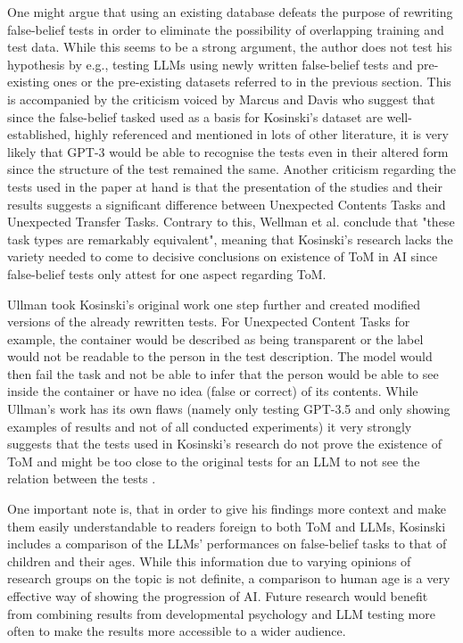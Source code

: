 One might argue that using an existing database defeats the purpose of rewriting false-belief tests in order to eliminate the possibility of overlapping training and test data. While this seems to be a strong argument, the author does not test his hypothesis by e.g., testing LLMs using newly written false-belief tests and pre-existing ones or the pre-existing datasets referred to in the previous section. This is accompanied by the criticism voiced by Marcus and Davis \cite{critics2} who suggest that since the false-belief tasked used as a basis for Kosinski's dataset are well-established, highly referenced and mentioned in lots of other literature, it is very likely that GPT-3 would be able to recognise the tests even in their altered form since the structure of the test remained the same. Another criticism regarding the tests used in the paper at hand is that the presentation of the studies and their results suggests a significant difference between Unexpected Contents Tasks and Unexpected Transfer Tasks. Contrary to this, Wellman et al. conclude that "these task types are remarkably equivalent"\cite{tom_children_2001, p. 665}, meaning that Kosinski's research lacks the variety needed to come to decisive conclusions on existence of ToM in AI since false-belief tests only attest for one aspect regarding ToM.

Ullman took Kosinski's original work one step further and created modified versions of the already rewritten tests. For Unexpected Content Tasks for example, the container would be described as being transparent or the label would not be readable to the person in the test description. The model would then fail the task and not be able to infer that the person would be able to see inside the container or have no idea (false or correct) of its contents. While Ullman's work has its own flaws (namely only testing GPT-3.5 and only showing examples of results and not of all conducted experiments) it very strongly suggests that the tests used in Kosinski's research do not prove the existence of ToM and might be too close to the original tests for an LLM to not see the relation between the tests \cite{critics3}.

One important note is, that in order to give his findings more context and make them easily understandable to readers foreign to both ToM and LLMs, Kosinski includes a comparison of the LLMs' performances on false-belief tasks to that of children and their ages. While this information due to varying opinions of research groups on the topic is not definite, a comparison to human age is a very effective way of showing the progression of AI. Future research would benefit from combining results from developmental psychology and LLM testing more often to make the results more accessible to a wider audience.



